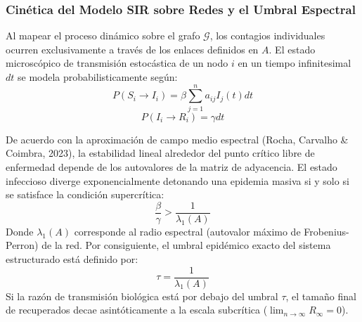 \documentclass[12pt]{article}
\begin{document}
\subsubsection{Cinética del Modelo SIR sobre Redes y el Umbral Espectral}
Al mapear el proceso dinámico sobre el grafo $\mathcal{G}$, los contagios individuales ocurren exclusivamente a través de los enlaces definidos en $A$. El estado microscópico de transmisión estocástica de un nodo $i$ en un tiempo infinitesimal $dt$ se modela probabilisticamente según:
\begin{equation}
    P(S_i \to I_i) = \beta \sum_{j=1}^{n} a_{ij} I_j(t) dt
\end{equation}
\begin{equation}
    P(I_i \to R_i) = \gamma dt
\end{equation}

De acuerdo con la aproximación de campo medio espectral (Rocha, Carvalho \& Coimbra, 2023), la estabilidad lineal alrededor del punto crítico libre de enfermedad depende de los autovalores de la matriz de adyacencia. El estado infeccioso diverge exponencialmente detonando una epidemia masiva si y solo si se satisface la condición supercrítica:
\begin{equation}
    \frac{\beta}{\gamma} > \frac{1}{\lambda_1(A)}
\end{equation}
Donde $\lambda_1(A)$ corresponde al radio espectral (autovalor máximo de Frobenius-Perron) de la red. Por consiguiente, el umbral epidémico exacto del sistema estructurado está definido por:
\begin{equation}
    \tau = \frac{1}{\lambda_1(A)}
\end{equation}
Si la razón de transmisión biológica está por debajo del umbral $\tau$, el tamaño final de recuperados decae asintóticamente a la escala subcrítica ($\lim_{n \to \infty} R_\infty = 0$).

\newpage
\end{document}
